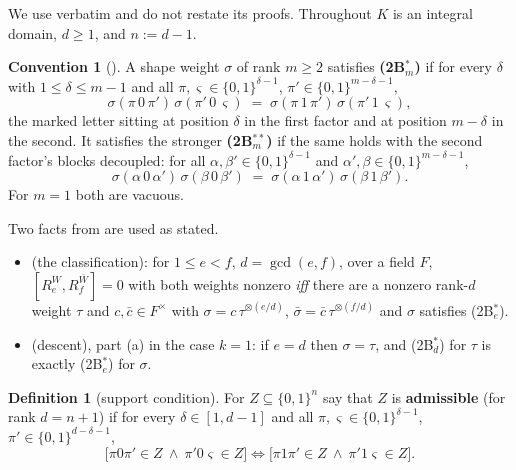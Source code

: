 \documentclass[11pt]{article}
\theoremstyle{definition}
\newtheorem{convention}[theorem]{Convention}
\newtheorem{definition}[theorem]{Definition}
\theoremstyle{remark}
\newcommand{\cube}{\{0,1\}}
\begin{document}
We use \cite[\S2]{Q150c1} verbatim and do not restate its proofs.  Throughout $K$ is an
integral domain, $d\ge1$, and $n:=d-1$.

\begin{convention}[{\cite[Conv.~2.1]{Q150c1}}]\label{conv:2B}
A shape weight $\sigma$ of rank $m\ge2$ satisfies \textbf{(2B$^*_m$)} if for every
$\delta$ with $1\le\delta\le m-1$ and all $\pi,\varsigma\in\cube^{\delta-1}$,
$\pi'\in\cube^{m-\delta-1}$,
\begin{equation}\label{eq:2Bstar}
  \sigma(\pi\,0\,\pi')\,\sigma(\pi'\,0\,\varsigma)
  \;=\;\sigma(\pi\,1\,\pi')\,\sigma(\pi'\,1\,\varsigma),
\end{equation}
the marked letter sitting at position $\delta$ in the first factor and at position $m-\delta$
in the second.  It satisfies the stronger \textbf{(2B$^{**}_m$)} if the same holds with the
second factor's blocks decoupled: for all $\alpha,\beta'\in\cube^{\delta-1}$ and
$\alpha',\beta\in\cube^{m-\delta-1}$,
\begin{equation}\label{eq:2Bss}
  \sigma(\alpha\,0\,\alpha')\,\sigma(\beta\,0\,\beta')
  \;=\;\sigma(\alpha\,1\,\alpha')\,\sigma(\beta\,1\,\beta') .
\end{equation}
For $m=1$ both are vacuous.
\end{convention}

Two facts from \cite{Q150c1} are used as stated.

\begin{itemize}
\item \cite[Thm.~1.3]{Q150c1} (the classification): for $1\le e<f$, $d=\gcd(e,f)$, over a field
$F$, $[R_e^{W},R_f^{\bar W}]=0$ with both weights nonzero \emph{iff} there are a nonzero
rank-$d$ weight $\tau$ and $c,\bar c\in F^\times$ with $\sigma=c\,\tau^{\otimes(e/d)}$,
$\bar\sigma=\bar c\,\tau^{\otimes(f/d)}$ and $\sigma$ satisfies (2B$^*_e$).
\item \cite[Lemma 5.1]{Q150c1} (descent), part (a) in the case $k=1$: if $e=d$ then
$\sigma=\tau$, and (2B$^*_d$) for $\tau$ is exactly (2B$^*_e$) for $\sigma$.
\end{itemize}

\begin{definition}[support condition]\label{def:S}
For $Z\subseteq\cube^{n}$ say that $Z$ is \textbf{admissible} (for rank $d=n+1$) if for every
$\delta\in[1,d-1]$ and all $\pi,\varsigma\in\cube^{\delta-1}$, $\pi'\in\cube^{d-\delta-1}$,
\begin{equation}\label{eq:S}
  \bigl[\pi0\pi'\in Z\ \wedge\ \pi'0\varsigma\in Z\bigr]
  \iff
  \bigl[\pi1\pi'\in Z\ \wedge\ \pi'1\varsigma\in Z\bigr].
\end{equation}
\end{definition}
\end{document}
